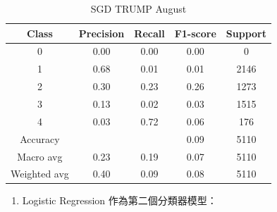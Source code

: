 \begin{enumerate}
\begin{table}[H]
        \vspace{1em}
        
        \scriptsize
        \begin{tabular}{c|cccc}
        \hline
        Class & Precision & Recall & F1-score & Support \\
        \hline
        0 & 0.00 & 0.00 & 0.00 & 0 \\
        1 & 0.68 & 0.01 & 0.01 & 2146 \\
        2 & 0.30 & 0.23 & 0.26 & 1273 \\
        3 & 0.13 & 0.02 & 0.03 & 1515 \\
        4 & 0.03 & 0.72 & 0.06 & 176 \\
        \hline
        Accuracy &       &      & 0.09 & 5110 \\
        Macro avg & 0.23 & 0.19 & 0.07 & 5110 \\
        Weighted avg & 0.40 & 0.09 & 0.08 & 5110 \\
        \hline
        \end{tabular}
        \caption{SGD TRUMP August}
        \label{tab:classifier_1_report_sgd_trump_non_filtered_aug}
        \end{table}


        \pagebreak

            \begin{enumerate}
                \item Logistic Regression 作為第二個分類器模型：
                

\end{enumerate}
\end{enumerate}
